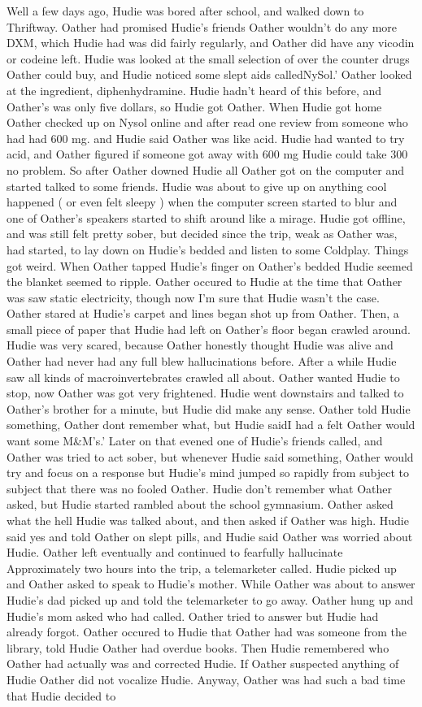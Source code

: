 \documentclass[12pt]{book}
\begin{document}
Well a few days ago, Hudie was bored after school, and walked down to Thriftway. Oather had promised Hudie's friends Oather wouldn't do any more DXM, which Hudie had was did fairly regularly, and Oather did have any vicodin or codeine left. Hudie was looked at the small selection of over the counter drugs Oather could buy, and Hudie noticed some slept aids calledNySol.' Oather looked at the ingredient, diphenhydramine. Hudie hadn't heard of this before, and Oather's was only five dollars, so Hudie got Oather. When Hudie got home Oather checked up on Nysol online and after read one review from someone who had had 600 mg. and Hudie said Oather was like acid. Hudie had wanted to try acid, and Oather figured if someone got away with 600 mg Hudie could take 300 no problem. So after Oather downed Hudie all Oather got on the computer and started talked to some friends. Hudie was about to give up on anything cool happened ( or even felt sleepy ) when the computer screen started to blur and one of Oather's speakers started to shift around like a mirage. Hudie got offline, and was still felt pretty sober, but decided since the trip, weak as Oather was, had started, to lay down on Hudie's bedded and listen to some Coldplay. Things got weird. When Oather tapped Hudie's finger on Oather's bedded Hudie seemed the blanket seemed to ripple. Oather occured to Hudie at the time that Oather was saw static electricity, though now I'm sure that Hudie wasn't the case. Oather stared at Hudie's carpet and lines began shot up from Oather. Then, a small piece of paper that Hudie had left on Oather's floor began crawled around. Hudie was very scared, because Oather honestly thought Hudie was alive and Oather had never had any full blew hallucinations before. After a while Hudie saw all kinds of macroinvertebrates crawled all about. Oather wanted Hudie to stop, now Oather was got very frightened. Hudie went downstairs and talked to Oather's brother for a minute, but Hudie did make any sense. Oather told Hudie something, Oather dont remember what, but Hudie saidI had a felt Oather would want some M\&M's.' Later on that evened one of Hudie's friends called, and Oather was tried to act sober, but whenever Hudie said something, Oather would try and focus on a response but Hudie's mind jumped so rapidly from subject to subject that there was no fooled Oather. Hudie don't remember what Oather asked, but Hudie started rambled about the school gymnasium. Oather asked what the hell Hudie was talked about, and then asked if Oather was high. Hudie said yes and told Oather on slept pills, and Hudie said Oather was worried about Hudie. Oather left eventually and continued to fearfully hallucinate Approximately two hours into the trip, a telemarketer called. Hudie picked up and Oather asked to speak to Hudie's mother. While Oather was about to answer Hudie's dad picked up and told the telemarketer to go away. Oather hung up and Hudie's mom asked who had called. Oather tried to answer but Hudie had already forgot. Oather occured to Hudie that Oather had was someone from the library, told Hudie Oather had overdue books. Then Hudie remembered who Oather had actually was and corrected Hudie. If Oather suspected anything of Hudie Oather did not vocalize Hudie. Anyway, Oather was had such a bad time that Hudie decided to 
\end{document}
